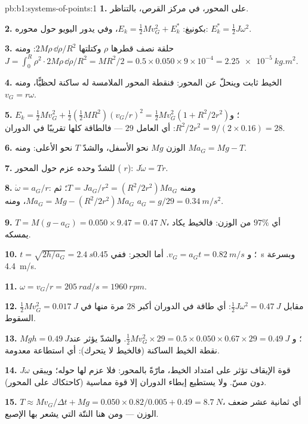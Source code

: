 \begin{solution}{pb:b1:systems-of-points:1}
\textbf{1.} على المحور، في مركز القرص، بالتناظر.

\textbf{2.} بكونيغ: $E_k = \tfrac12 Mv_G^2 + E_k^*$، وفي  يدور اليويو حول محوره: $E_k^* = \tfrac12 J\omega^2$.

\textbf{3.} حلقة نصف قطرها $\rho$ وكتلتها $2M\rho\,\dd\rho/R^2$: ومنه $J = \int_0^R
\rho^2\cdot 2M\rho\,\dd\rho/R^2 = MR^2/2 = 0.5 \times 0.050 \times 9\times10^{-4}
= \qty{2.25e-5}{kg.m^2}$.

\textbf{4.} الخيط ثابت وينحلّ عن المحور: فنقطة
المحور الملامسة له ساكنة لحظيًّا، ومنه $v_G = r\omega$.

\textbf{5.} $E_k = \tfrac12 Mv_G^2 + \tfrac12(\tfrac12 MR^2)(v_G/r)^2 = \tfrac12
Mv_G^2(1 + R^2/2r^2)$؛ و $R^2/2r^2 = 9/(2 \times 0.16) = 28$: أي العامل $29$ ---
فالطاقة كلها تقريبًا في الدوران.

\textbf{6.} الوزن $Mg$ نحو الأسفل، والشدّ $T$ نحو الأعلى: ومنه $Ma_G = Mg - T$.

\textbf{7.} للشدّ وحده عزم حول المحور ( $r$):
$J\dot\omega = Tr$.

\textbf{8.} $\dot\omega = a_G/r$: ومنه $T = Ja_G/r^2 = (R^2/2r^2)Ma_G$؛ ثم
$Ma_G = Mg - (R^2/2r^2)Ma_G$، ومنه $a_G = g/29 = \qty{0.34}{m/s^2}$.

\textbf{9.} $T = M(g - a_G) = 0.050 \times 9.47 = \qty{0.47}{N}$، أي $97\%$ من
الوزن: فالخيط يكاد يمسكه.

\textbf{10.} $t = \sqrt{2h/a_G} = \qty{2.4}{s}$؛ و $v_G = a_Gt = \qty{0.82}{m/s}$.
أما الحجر: ففي \qty{0.45}{s} وبسرعة \qty{4.4}{m/s}.

\textbf{11.} $\omega = v_G/r = \qty{205}{rad/s} = \qty{1960}{rpm}$.

\textbf{12.} $\tfrac12 Mv_G^2 = \qty{0.017}{J}$ مقابل $\tfrac12 J\omega^2 =
\qty{0.47}{J}$: أي طاقة في الدوران أكبر $28$ مرة منها في السقوط.

\textbf{13.} $Mgh = \qty{0.49}{J}$؛ و $\tfrac12 Mv_G^2 \times 29 = 0.5 \times 0.050
\times 0.67 \times 29 = \qty{0.49}{J}$. والشدّ يؤثر عند نقطة
الخيط الساكنة (فالخيط لا يتحرك): أي استطاعة معدومة.

\textbf{14.} قوة الإيقاف تؤثر على امتداد الخيط، مارّةً بالمحور:
فلا عزم لها حوله؛ ويبقى  $J\omega$ دون مسّ. ولا يستطيع
إبطاء الدوران إلا قوة مماسية (كاحتكاك على المحور).

\textbf{15.} $T \approx Mv_G/\Delta t + Mg = 0.050 \times 0.82/0.005 + 0.49 =
\qty{8.7}{N}$، أي ثمانية عشر ضعف الوزن --- ومن هنا النتّة التي يشعر بها
الإصبع.


\end{solution}
